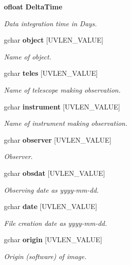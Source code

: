 \begin{CompactItemize}
{\bf ofloat} {\bf Delta\-Time}
\begin{CompactList}\small\item\em Data integration time in Days. \item\end{CompactList}\item 
gchar {\bf object} [UVLEN\_\-VALUE]
\begin{CompactList}\small\item\em Name of object. \item\end{CompactList}\item 
gchar {\bf teles} [UVLEN\_\-VALUE]
\begin{CompactList}\small\item\em Name of telescope making observation. \item\end{CompactList}\item 
gchar {\bf instrument} [UVLEN\_\-VALUE]
\begin{CompactList}\small\item\em Name of instrument making observation. \item\end{CompactList}\item 
gchar {\bf observer} [UVLEN\_\-VALUE]
\begin{CompactList}\small\item\em Observer. \item\end{CompactList}\item 
gchar {\bf obsdat} [UVLEN\_\-VALUE]
\begin{CompactList}\small\item\em Observing date as yyyy-mm-dd. \item\end{CompactList}\item 
gchar {\bf date} [UVLEN\_\-VALUE]
\begin{CompactList}\small\item\em File creation date as yyyy-mm-dd. \item\end{CompactList}\item 
gchar {\bf origin} [UVLEN\_\-VALUE]
\begin{CompactList}\small\item\em Origin (software) of image. \item\end{CompactList}\item 

\end{CompactItemize}
